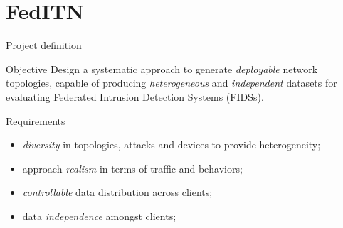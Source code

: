 \section{FedITN}

\begin{frame}{Project definition}
  \begin{block}{Objective}
  Design a systematic approach to generate \emph<+>{deployable} network topologies, capable of producing \emph<+>{heterogeneous} and \emph<+>{independent} datasets for evaluating Federated Intrusion Detection Systems (FIDSs).
  \end{block}

  \pause
  \begin{block}{Requirements}
    \begin{itemize}[<+->]
      \item \emph{diversity} in topologies, attacks and devices to provide heterogeneity;
      \item approach \emph{realism} in terms of traffic and behaviors;
      \item \emph{controllable} data distribution across clients;
      \item data \emph{independence} amongst clients;
    \end{itemize}
  \end{block}
\end{frame}

    

